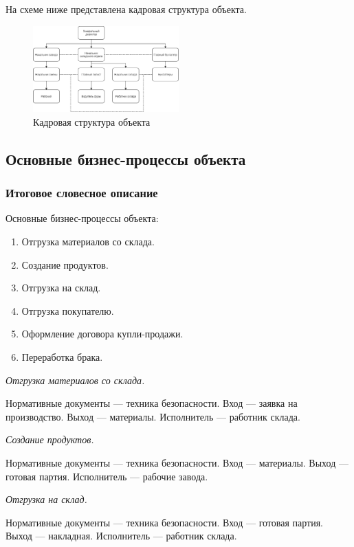 На схеме ниже представлена кадровая структура объекта.

\begin{figure}[h!]
        \centering
        \includegraphics[width=0.5\textwidth]{images/3/hr.eps}
	\caption{Кадровая структура объекта}
\end{figure}

\subsection{Основные бизнес-процессы объекта}

\subsubsection{Итоговое словесное описание}

Основные бизнес-процессы объекта:

\begin{enumerate}

	\item{Отгрузка материалов со склада.}
	\item{Создание продуктов.}
	\item{Отгрузка на склад.}
	\item{Отгрузка покупателю.}
	\item{Оформление договора купли-продажи.}
	\item{Переработка брака.}

\end{enumerate}

	\emph{Отгрузка материалов со склада.}

	Нормативные документы --- техника безопасности.  Вход --- заявка на производство.  Выход --- материалы.  Исполнитель --- работник склада.

	\emph{Создание продуктов.}


	Нормативные документы --- техника безопасности.  Вход --- материалы.  Выход --- готовая партия.  Исполнитель --- рабочие завода.

	\emph{Отгрузка на склад.}


	Нормативные документы --- техника безопасности.  Вход --- готовая партия.  Выход --- накладная.  Исполнитель --- работник склада.

